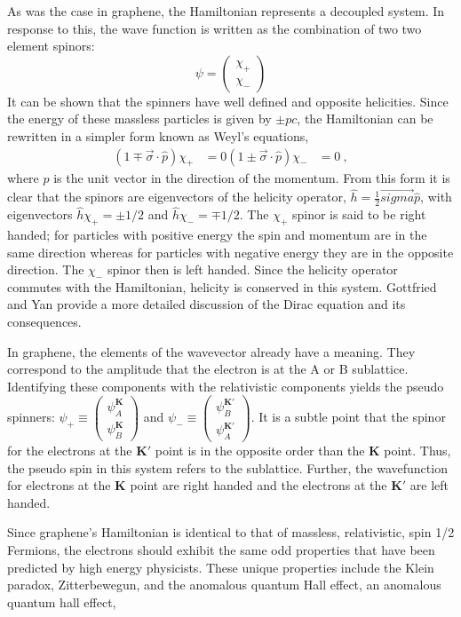 As was the case in graphene, the Hamiltonian represents a decoupled system.
In response to this, the wave function is written as the combination of two two element spinors:
\begin{equation*}
	\psi=\left( \begin{array}{c} \chi_{+} \\ \chi_{-} \end{array} \right)
\end{equation*}
It can be shown that the spinners have well defined and opposite helicities.
Since the energy of these massless particles is given by $\pm p c$, the Hamiltonian can be rewritten in a simpler form known as Weyl's equations,
\begin{align*}
	(1 \mp \vec{\sigma} \cdot \hat{p}) \chi_{+}&=0
	(1 \pm \vec{\sigma} \cdot \hat{p}) \chi_{-}&=0 \ ,
\end{align*}
where $\hat{p}$ is the unit vector in the direction of the momentum.
From this form it is clear that the spinors are eigenvectors of the helicity operator, $\hat{h}=\frac{1}{2} \vec{sigma} \hat{p}$, with eigenvectors $\hat{h} \chi_+=\pm 1/2$ and $\hat{h} \chi_-=\mp 1/2$.
The $\chi_+$ spinor is said to be right handed; for particles with positive energy the spin and momentum are in the same direction whereas for particles with negative energy they are in the opposite direction.
The $\chi_-$ spinor then is left handed.
Since the helicity operator commutes with the Hamiltonian, helicity is conserved in this system.
Gottfried and Yan provide a more detailed discussion of the Dirac equation and its consequences\cite{Gottfried2003}.

In graphene, the elements of the wavevector already have a meaning.
They correspond to the amplitude that the electron is at the A or B sublattice.
Identifying these components with the relativistic components yields the pseudo spinners: $\psi_+ \equiv \left(\begin{array}{c} \psi_A^{\bm{K}} \\ \psi_B^{\bm{K}} \end{array} \right)$ and $\psi_- \equiv \left(\begin{array}{c} \psi_B^{\bm{K'}} \\ \psi_A^{\bm{K'}} \end{array} \right)$.
It is a subtle point that the spinor for the electrons at the $\bm{K'}$ point is in the opposite order than the $\bm{K}$ point.
Thus, the pseudo spin in this system refers to the sublattice.
Further, the wavefunction for electrons at the $\bm{K}$ point are right handed and the electrons at the $\bm{K'}$ are left handed.

Since graphene's Hamiltonian is identical to that of massless, relativistic, spin 1/2 Fermions, the electrons should exhibit the same odd properties that have been predicted by high energy physicists.
These unique properties include the Klein paradox, Zitterbewegun, and the anomalous quantum Hall effect, an anomalous quantum hall effect, 